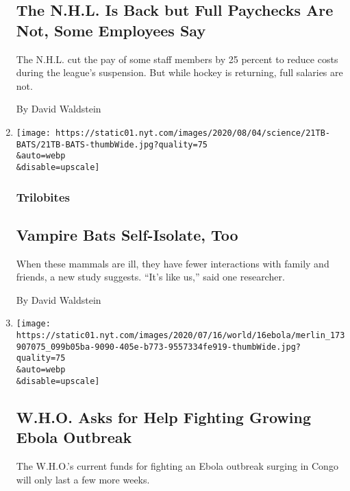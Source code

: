 \begin{enumerate}
  \hypertarget{the-nhl-is-back-but-full-paychecks-are-not-some-employees-say}{%
  \subsection{The N.H.L. Is Back but Full Paychecks Are Not, Some
  Employees
  Say}\label{the-nhl-is-back-but-full-paychecks-are-not-some-employees-say}}

  The N.H.L. cut the pay of some staff members by 25 percent to reduce
  costs during the league's suspension. But while hockey is returning,
  full salaries are not.

  By David Waldstein
\item
  \href{/2020/07/22/science/vampire-bats-viruses.html}{}

  \texttt{[image: https://static01.nyt.com/images/2020/08/04/science/21TB-BATS/21TB-BATS-thumbWide.jpg?quality=75\\\&auto=webp\\\&disable=upscale]}

  \hypertarget{trilobites}{%
  \subsubsection{Trilobites}\label{trilobites}}

  \hypertarget{vampire-bats-self-isolate-too}{%
  \subsection{Vampire Bats Self-Isolate,
  Too}\label{vampire-bats-self-isolate-too}}

  When these mammals are ill, they have fewer interactions with family
  and friends, a new study suggests. ``It's like us,'' said one
  researcher.

  By David Waldstein
\item
  \href{/2020/07/16/world/africa/ebola-congo-outbreak.html}{}

  \texttt{[image: https://static01.nyt.com/images/2020/07/16/world/16ebola/merlin\_173907075\_099b05ba-9090-405e-b773-9557334fe919-thumbWide.jpg?quality=75\\\&auto=webp\\\&disable=upscale]}

  \hypertarget{who-asks-for-help-fighting-growing-ebola-outbreak}{%
  \subsection{W.H.O. Asks for Help Fighting Growing Ebola
  Outbreak}\label{who-asks-for-help-fighting-growing-ebola-outbreak}}

  The W.H.O.'s current funds for fighting an Ebola outbreak surging in
  Congo will only last a few more weeks.


\end{enumerate}
